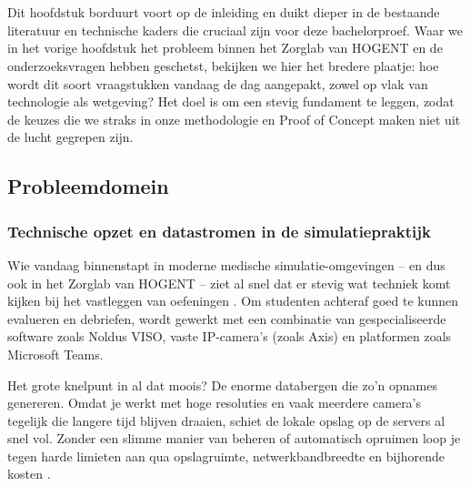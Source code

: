 \chapter{}%
\label{ch:stand-van-zaken}



Dit hoofdstuk borduurt voort op de inleiding en duikt dieper in de bestaande literatuur en technische kaders die cruciaal zijn voor deze bachelorproef. Waar we in het vorige hoofdstuk het probleem binnen het Zorglab van HOGENT en de onderzoeksvragen hebben geschetst, bekijken we hier het bredere plaatje: hoe wordt dit soort vraagstukken vandaag de dag aangepakt, zowel op vlak van technologie als wetgeving? Het doel is om een stevig fundament te leggen, zodat de keuzes die we straks in onze methodologie en Proof of Concept maken niet uit de lucht gegrepen zijn.

\section{Probleemdomein}%
\label{subsec:lit_probleemdomein}

\subsection{Technische opzet en datastromen in de simulatiepraktijk}
Wie vandaag binnenstapt in moderne medische simulatie-omgevingen – en dus ook in het Zorglab van HOGENT – ziet al snel dat er stevig wat techniek komt kijken bij het vastleggen van oefeningen \parencite{CHSU2023}. Om studenten achteraf goed te kunnen evalueren en debriefen, wordt gewerkt met een combinatie van gespecialiseerde software zoals Noldus VISO, vaste IP-camera's (zoals Axis) en platformen zoals Microsoft Teams.

Het grote knelpunt in al dat moois? De enorme databergen die zo'n opnames genereren. Omdat je werkt met hoge resoluties en vaak meerdere camera's tegelijk die langere tijd blijven draaien, schiet de lokale opslag op de servers al snel vol. Zonder een slimme manier van beheren of automatisch opruimen loop je tegen harde limieten aan qua opslagruimte, netwerkbandbreedte en bijhorende kosten \parencite{CHSU2023}.

